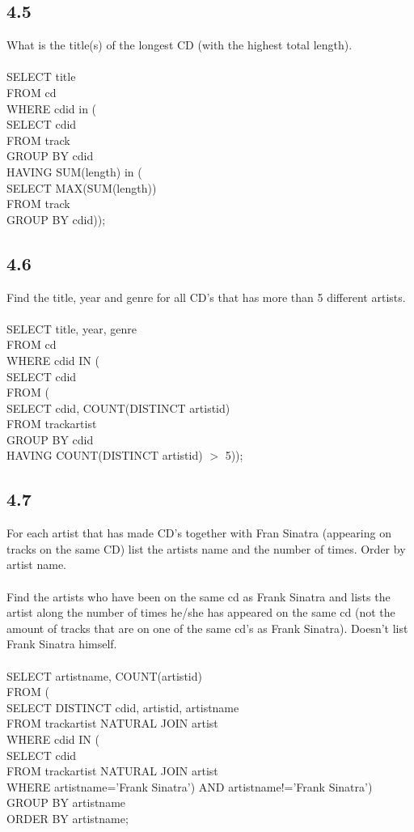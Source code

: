 \documentclass[12pt]{article}
\begin{document}
\subsection*{4.5}
What is the title(s) of the longest CD (with the highest total length).\\
\\
SELECT title\\
FROM cd\\
WHERE cdid in (\\
SELECT cdid\\
FROM track\\
GROUP BY cdid\\
HAVING SUM(length) in (\\
SELECT MAX(SUM(length))\\
FROM track\\
GROUP BY cdid));

\subsection*{4.6}
Find the title, year and genre for all CD’s that has more than 5 different artists.\\
\\
SELECT title, year, genre\\
FROM cd\\
WHERE cdid IN (\\
SELECT cdid\\
FROM (\\
SELECT cdid, COUNT(DISTINCT artistid)\\
FROM trackartist\\
GROUP BY cdid\\
HAVING COUNT(DISTINCT artistid) $>$ 5));

\subsection*{4.7}
For each artist that has made CD’s together with Fran Sinatra (appearing on tracks on the same CD) list the artists name and the number of times. Order by artist name.\\
\\
Find the artists who have been on the same cd as Frank Sinatra and lists the artist along the number of times he/she has appeared on the same cd (not the amount of tracks that are on one of the same cd's as Frank Sinatra). Doesn't list Frank Sinatra himself.\\
\\
SELECT artistname, COUNT(artistid)\\
FROM (\\
SELECT DISTINCT cdid, artistid, artistname\\
FROM trackartist NATURAL JOIN artist\\
WHERE cdid IN (\\
SELECT cdid\\
FROM trackartist NATURAL JOIN artist\\
WHERE artistname='Frank Sinatra') AND artistname!='Frank Sinatra')\\
GROUP BY artistname\\
ORDER BY artistname;
\end{document}
